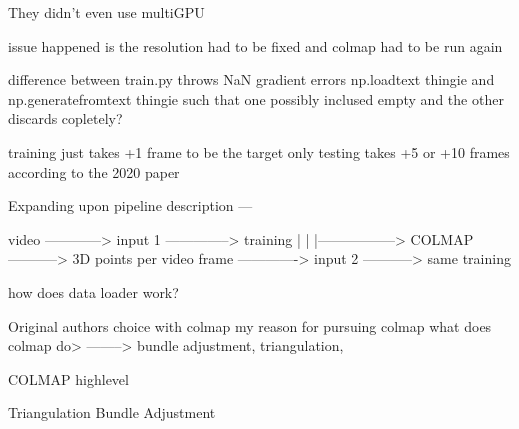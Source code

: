 They didn't even use multiGPU

issue happened is the resolution had to be fixed and colmap had to be run again

difference between train.py throws NaN gradient errors np.loadtext thingie and np.generatefromtext thingie such that one possibly inclused empty and the other discards copletely?

training just takes +1 frame to be the target
only testing takes +5 or +10 frames according to the 2020 paper


Expanding upon pipeline description ---

video ------------> input 1 --------------> training
|
|
|-----------------> COLMAP -----------> 3D points per video frame -------------> input 2 -----------> same training

how does data loader work?

Original authors choice with colmap 
my reason for pursuing colmap
what does colmap do> --------> bundle adjustment, triangulation, 

COLMAP highlevel

Triangulation
Bundle Adjustment